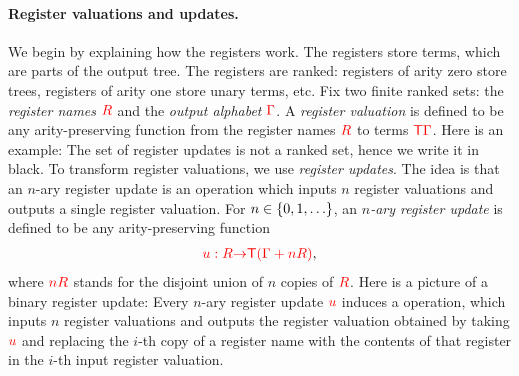 


\paragraph*{Register valuations and updates.} We begin by explaining how the registers work.  The registers store terms, which are parts of the output tree. The registers are ranked: registers of arity zero  store trees, registers of arity one store unary terms, etc.  Fix two finite ranked sets: the \emph{register names} ${{\color{red}{R}}}$ and the \emph{output alphabet} ${\color{red}{\Gamma}}$.
A \emph{register valuation} is defined to be any arity-preserving function from the register names ${{\color{red}{R}}}$ to terms ${\color{red}{\mathsf T}} {\color{red}{\Gamma}}$. Here is an example: 
The set of register updates is not a ranked set, hence we write it in black.
To transform register valuations, we use \emph{register updates}.  The idea is that an $n$-ary register update is an operation which inputs $n$ register valuations and outputs a single register valuation. For  $n \in \{0,1,\ldots\}$, an \emph{$n$-ary register update}  is defined to be any arity-preserving function
\begin{align*}
    {\color{red}{u : {{\color{red}{R}}}{\color{red}{\to}}{\color{red}{\mathsf T}}( {\color{red}{\Gamma}}+ n{{\color{red}{R}}})}},
\end{align*}
where ${\color{red}{nR}}$ stands for the disjoint union of $n$ copies of ${{\color{red}{R}}}$.
Here is a picture of a binary register update:
Every $n$-ary register update ${\color{red}{u}}$ induces a operation, which inputs  $n$ register valuations and  outputs the  register valuation obtained by  taking ${\color{red}{u}}$ and replacing the $i$-th copy of a register name with the  contents of that register in the $i$-th input register valuation. 
